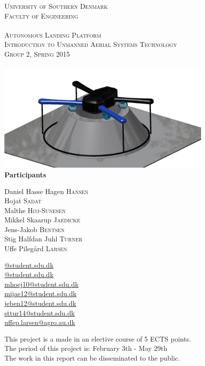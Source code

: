 \begin{titlepage}
\begin{center}
	
	\textsc{\LARGE{University of Southern Denmark\\Faculty of Engineering}}\\[1.5cm]
	\HRule \\[0.4cm]
	\textsc{\huge{Autonomous Landing Platform}}\\
	\textsc{\Large{Introduction to Unmanned Aerial Systems Technology\\Group 2, Spring 2015}}\\[0.4cm]
	\HRule \\[1.5cm]
	\includegraphics[width=0.8\textwidth]{imgs/frontpage}~\\[1.5cm]
	\textbf{Participants}\\
	\begin{minipage}[t]{0.48\textwidth}
		\begin{flushright}
			Daniel Hasse Hagen \textsc{Hansen}\\
			Hojat \textsc{Sadat}\\
			Malthe \textsc{Høj-Sunesen}\\
			Mikkel Skaarup \textsc{Jaedicke}\\
			Jens-Jakob \textsc{Bentsen}\\
			Stig Halfdan Juhl \textsc{Turner}\\
			Uffe Pilegård \textsc{Larsen}
		\end{flushright}
	\end{minipage}
	\hfill
	\begin{minipage}[t]{0.48\textwidth}
		\begin{flushleft}
			\url{@student.sdu.dk}\\
			\url{@student.sdu.dk}\\
			\url{mhoej10@student.sdu.dk}\\
			\url{mijae12@student.sdu.dk}\\
			\url{jeben12@student.sdu.dk}\\
			\url{sttur14@student.sdu.dk}\\
			\url{uffep.larsen@agro.au.dk}\\
		\end{flushleft} 
	\end{minipage}
	\vfill
	\large{This project is a made in an elective course of 5 ECTS points. \\
		The period of this project is: February 3th - May 29th\\
		The work in this report can be disseminated to the public.}
	
\end{center}
\end{titlepage}